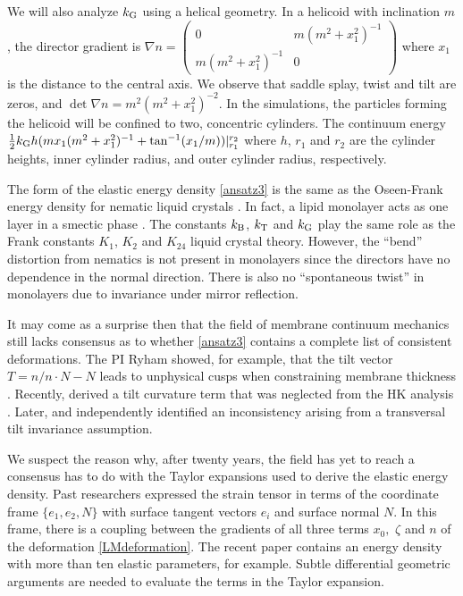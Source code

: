 We will also analyze $k_{\mathrm{G}}$ using a helical geometry. In a helicoid with inclination $m$, the director
gradient is $\nabla n = \begin{pmatrix} 0 & m(m^2+x_1^2)^{-1} \\ m(m^2+x_1^2)^{-1} & 0\end{pmatrix}$ where $x_1$ is the distance to the central
axis. We observe that saddle splay, twist and tilt are zeros, and $\det \nabla n = m^2(m^2+x_1^2)^{-2}$.
In the simulations, the particles forming the helicoid will be confined to two, concentric cylinders. The
continuum energy $\tfrac{1}{2}k_{\mathrm{G}} h(m x_1(m^2+x_1^2)^{-1} + \tan^{-1}(x_1/m)) |_{r_1}^{r_2}$ where $h$, $r_1$ and $r_2$
are the cylinder heights, inner cylinder radius, and outer cylinder radius, respectively. 

The form of the elastic energy density \eqref{ansatz3} is the same as
the Oseen-Frank energy density for nematic liquid crystals \cite{ANDRIENKO2018520,Tran7106,Helfrich73}.   In fact,  
a lipid monolayer acts as one layer in a smectic  phase \cite{REYESMATEO1995978,Rangamani20140463,PhysRevLett.113.248102}. 
The constants $k_{\mathrm{B}}$, $k_{\mathrm{T}}$  and $k_{\mathrm{G}}$ play the same role as the Frank constants $K_1$, $K_2$ and $K_{24}$
liquid crystal theory. However, the ``bend'' distortion from nematics  
is not present in monolayers since the directors have no dependence in the normal direction.
There is also no ``spontaneous twist'' in monolayers due to invariance under mirror reflection. 

 It may come as a surprise then that the field of membrane continuum mechanics still lacks consensus as to
  whether \eqref{ansatz3} contains a complete list of consistent deformations.
  The PI Ryham showed, for example, that the tilt vector $T = n/n\cdot N - N$ leads to unphysical cusps when constraining membrane thickness
 \cite{RyKlYaCo16}.
  Recently, \cite{TerziDeserno17} derived a tilt curvature term that was neglected from the HK analysis \cite{Hamm2000}.
  Later, \cite{C9SM02079A} 
  and \cite{PhysRevE.102.042406} independently identified an inconsistency \cite{TerziDeserno17} arising
  from a transversal tilt invariance assumption. 

  We suspect the reason why, after twenty years, the field has yet to reach a consensus 
  has to do with the Taylor expansions used to derive the elastic energy density. 
  Past researchers expressed the strain tensor in
  terms of the coordinate frame $\{e_1, e_2, N\}$ with surface tangent vectors $e_i$ and surface normal $N$.  
  In this frame, there is a coupling between the gradients of all three terms $x_0,$ $\zeta$ and $n$ of the deformation \eqref{LMdeformation}.
  The recent paper \cite{PhysRevE.102.042406} contains an energy density with more than ten elastic parameters, for example.
  Subtle differential geometric arguments are needed to evaluate the terms in the Taylor expansion.

